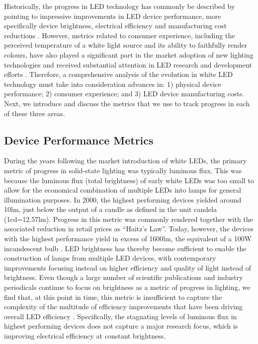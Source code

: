 \documentclass[journal=jacsat,manuscript=article]{achemso}
\begin{document}
Historically, the progress in LED technology has commonly be described by pointing to impressive improvements in LED device performance, more specifically device brightness, electrical efficiency and manufacturing cost reductions \cite{Taki2019}. However, metrics related to consumer experience, including the perceived temperature of a white light source and its ability to faithfully render colours, have also played a significant part in the market adoption of new lighting technologies \cite{Menanteau2000}\cite{Sandahl2006}\cite{CAIRD2008}\cite{murphy2012governing} and received substantial attention in LED research and development efforts \cite{azevedo2009transition}\cite{cho2017white}. Therefore, a comprehensive analysis of the evolution in white LED technology must take into consideration advances in: 1) physical device performance; 2) consumer experience; and 3) LED device manufacturing costs. Next, we introduce and discuss the metrics that we use to track progress in each of these three areas.

\subsection{Device Performance Metrics}
\label{sec:device_performance_metrics}

During the years following the market introduction of white LEDs, the primary metric of progress in solid-state lighting was typically luminous flux. This was because the luminous flux (total brightness) of early white LEDs was too small to allow for the economical combination of multiple LEDs into lamps for general illumination purposes. In 2000, the highest performing devices yielded around 10lm, just below the output of a candle as defined in the unit candela (1cd=12.57lm)\cite{haitz2011solid}. Progress in this metric was commonly rendered together with the associated reduction in retail prices as “Haitz’s Law”\cite{haitz1999case}\cite{haitz2011solid}. Today, however, the devices with the highest performance yield in excess of 1600lm, the equivalent of a 100W incandescent bulb \cite{cree2020bright}. LED brightness has thereby become sufficient to enable the construction of lamps from multiple LED devices, with contemporary improvements focusing instead on higher efficiency and quality of light instead of brightness. Even though a large number of scientific publications and industry periodicals continue to focus on brightness as a metric of progress in lighting, we find that, at this point in time, this metric is insufficient to capture the complexity of the multitude of efficiency improvements that have been driving overall LED efficiency \cite{weinold2021compound}. Specifically,  the stagnating levels of luminous flux in highest performing devices does not capture a major research focus, which is improving electrical efficiency at constant brightness.
\end{document}
